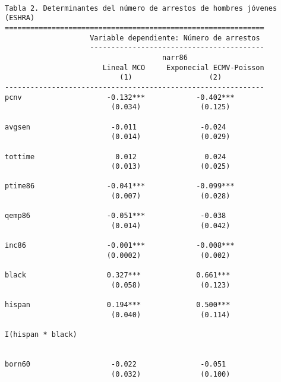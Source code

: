 \documentclass[
  letterpaper,
  DIV=11,
  numbers=noendperiod]{scrreprt}
\begin{document}
\begin{verbatim}

Tabla 2. Determinantes del número de arrestos de hombres jóvenes (ESHRA)
=============================================================
                    Variable dependiente: Número de arrestos 
                    -----------------------------------------
                                     narr86                  
                       Lineal MCO     Exponecial ECMV-Poisson
                           (1)                  (2)          
-------------------------------------------------------------
pcnv                    -0.132***            -0.402***       
                         (0.034)              (0.125)        
                                                             
avgsen                   -0.011               -0.024         
                         (0.014)              (0.029)        
                                                             
tottime                   0.012                0.024         
                         (0.013)              (0.025)        
                                                             
ptime86                 -0.041***            -0.099***       
                         (0.007)              (0.028)        
                                                             
qemp86                  -0.051***             -0.038         
                         (0.014)              (0.042)        
                                                             
inc86                   -0.001***            -0.008***       
                        (0.0002)              (0.002)        
                                                             
black                   0.327***             0.661***        
                         (0.058)              (0.123)        
                                                             
hispan                  0.194***             0.500***        
                         (0.040)              (0.114)        
                                                             
I(hispan * black)                                            
                                                             
                                                             
born60                   -0.022               -0.051         
                         (0.032)              (0.100)        
                                                             

\end{verbatim}
\end{document}
